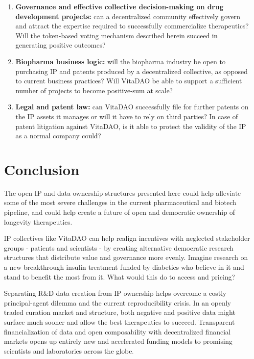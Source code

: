 \documentclass[12pt,letterpaper]{article}
\begin{document}
\begin{enumerate}
\item \textbf{Governance and effective collective decision-making on drug development projects:} can a decentralized community effectively govern and attract the expertise required to successfully commercialize therapeutics? Will the token-based voting mechanism described herein succeed in generating positive outcomes?  
\item \textbf{Biopharma business logic:} will the biopharma industry be open to purchasing IP and patents produced by a decentralized collective, as opposed to current business practices? Will VitaDAO be able to support a sufficient number of projects to become positive-sum at scale?
\item \textbf{Legal and patent law:} can VitaDAO successfully file for further patents on the IP assets it manages or will it have to rely on third parties? In case of patent litigation against VitaDAO, is it able to protect the validity of the IP as a normal company could?
\end{enumerate}

\section{Conclusion}
The open IP and data ownership structures presented here could help alleviate some of the most severe challenges in the current pharmaceutical and biotech pipeline, and could help create a future of open and democratic ownership of longevity therapeutics. 

IP collectives like VitaDAO can help realign incentives with neglected stakeholder groups - patients and scientists - by creating alternative democratic research structures that distribute value and governance more evenly. Imagine research on a new breakthrough insulin treatment funded by diabetics who believe in it and stand to benefit the most from it. What would this do to access and pricing? 

Separating R\&D data creation from IP ownership helps overcome a costly principal-agent dilemma and the current reproducibility crisis. In an openly traded curation market and structure, both negative and positive data might surface much sooner and allow the best therapeutics to succeed. Transparent financialization of data and open composability with decentralized financial markets opens up entirely new and accelerated funding models to promising scientists and laboratories across the globe. 
\end{document}
